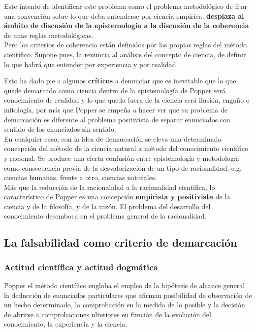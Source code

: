 \documentclass[a4paper, 11pt, twocolumn, spanish]{article}
\begin{document}
Este intento de identificar este problema como el problema
metodológico de fijar una convención sobre lo que deba entenderse por
ciencia empírica, \textbf{desplaza al ámbito de discusión de la epistemología
a la discusión de la coherencia} de unas reglas metodológicas.\\[0pt]
Pero los criterios de coherencia están definidos por las propias
reglas del método científico. Supone pues, la renuncia al análisis del
concepto de ciencia, de definir lo que habrá que entender por
experiencia y por realidad.

Esto ha dado pie a algunos \textbf{críticos} a denunciar que es inevitable
que lo que quede demarcado como ciencia dentro de la epistemología de
Popper será conocimiento de realidad y lo que queda fuera de la
ciencia será ilusión, engaño o mitología, por más que Popper se empeña
a hacer ver que su problema de demarcación es diferente al problema
positivista de separar enunciados con sentido de los enunciados sin
sentido.\\[0pt]

En cualquier caso, con la idea de demarcación se eleva una determinada
concepción del método de la ciencia natural a método del conocimiento
científico y racional. Se produce una cierta confusión entre
epistemología y metodología como consecuencia previa de la
desvalorización de un tipo de racionalidad, e.g. ciencias humanas,
frente a otro, ciencias naturales.\\[0pt]
Más que la reducción de la racionalidad a la racionalidad científica,
lo característico de Popper es una concepción \textbf{empirista y
positivista} de la ciencia y de la filosofía, y de la razón. El
problema del desarrollo del conocimiento desemboca en el problema
general de la racionalidad.

\subsection{La falsabilidad como criterio de demarcación}
\label{sec:org55ab0ac}

\subsubsection{Actitud científica y actitud dogmática}
\label{sec:org11f131d}
Popper el método científico engloba el empleo de la hipótesis de
alcance general la deducción de enunciados particulares que afirman
posibilidad de observación de un hecho determinado, la comprobación en
la medida de lo posible y la decisión de abrirse a comprobaciones
ulteriores en función de la evolución del conocimiento, la experiencia
y la ciencia.\\[0pt]
\end{document}
